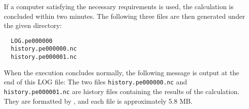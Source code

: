If a computer satisfying the necessary requirements is used,
the calculation is concluded within two minutes.
The following three files are then generated under the given directory:
\begin{verbatim}
  LOG.pe000000
  history.pe000000.nc
  history.pe000001.nc
\end{verbatim}
When the execution concludes normally,
the following message is output at the end of this LOG file:
The two files \verb|history.pe000000.nc| and \verb|history.pe000001.nc| are history files containing the results of the calculation. They are formatted by \netcdf, and each file is approximately 5.8 MB.
